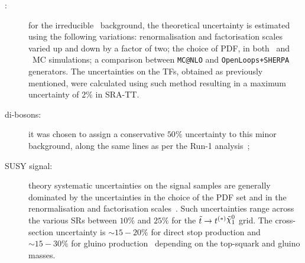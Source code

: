 \begin{description}
				\item [\boldmath \ttV :] for the irreducible \ttV\ background, the theoretical uncertainty is estimated using the following variations: renormalisation and factorisation scales varied up and down by a factor of two; the choice of \ac{PDF}, in both \ttV\ and \ttgamma\ \ac{MC} simulations; a comparison between \texttt{MC@NLO} and \texttt{OpenLoops+SHERPA} generators. The uncertainties on the \acp{TF}, obtained as previously mentioned, were calculated using such method resulting in a maximum uncertainty of $2\%$ in SRA-TT.

				\item [di-bosons:] it was chosen to assign a conservative $50\%$ uncertainty to this minor background, along the same lines as per the Run-1 analysis~\cite{stop0LRun1};

				\item [SUSY signal:] theory systematic uncertainties on the signal samples are generally dominated by the uncertainties in the choice of the \ac{PDF} set and in the renormalisation and factorisation scales~\cite{Beenakker2011}. Such uncertainties range across the various \acp{SR} between $10\%$ and $25\%$ for the $\stop\to t^{(*)} \ninoone$ grid. %
				The cross-section uncertainty is $\sim15-20\%$ for direct stop production and $\sim15-30\%$ for gluino production~\cite{Beenakker:1997ut,Beenakker:2010nq,Beenakker:2011fu,Borschensky:2014cia} depending on the top-squark and gluino masses.
			\end{description}


